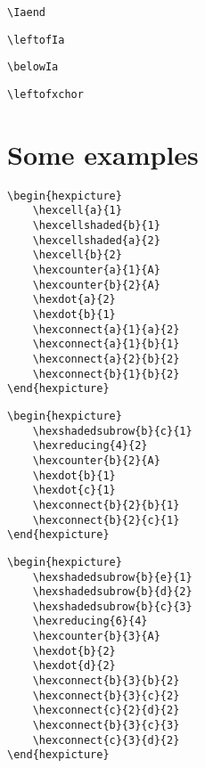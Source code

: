 \documentclass[a4paper,12pt]{article}
\begin{document}
	\verb|\Iaend|
    
	\verb|\leftofIa|
    
	\verb|\belowIa|
    
	\verb|\leftofxchor|
    
    \section{Some examples}
    
    \begin{verbatim}\begin{hexpicture}
    \hexcell{a}{1}
    \hexcellshaded{b}{1}
    \hexcellshaded{a}{2}
    \hexcell{b}{2}
    \hexcounter{a}{1}{A}
    \hexcounter{b}{2}{A}
    \hexdot{a}{2}
    \hexdot{b}{1}
    \hexconnect{a}{1}{a}{2}
    \hexconnect{a}{1}{b}{1}
    \hexconnect{a}{2}{b}{2}
    \hexconnect{b}{1}{b}{2}
\end{hexpicture}\end{verbatim}
    
    \begin{hexpicture}
    \end{hexpicture}
    
    \begin{verbatim}\begin{hexpicture}
    \hexshadedsubrow{b}{c}{1}
    \hexreducing{4}{2}
    \hexcounter{b}{2}{A}
    \hexdot{b}{1}
    \hexdot{c}{1}
    \hexconnect{b}{2}{b}{1}
    \hexconnect{b}{2}{c}{1}
\end{hexpicture}\end{verbatim}
    
    \begin{hexpicture}
    \end{hexpicture}
    
    \begin{verbatim}\begin{hexpicture}
    \hexshadedsubrow{b}{e}{1}
    \hexshadedsubrow{b}{d}{2}
    \hexshadedsubrow{b}{c}{3}
    \hexreducing{6}{4}
    \hexcounter{b}{3}{A}
    \hexdot{b}{2}
    \hexdot{d}{2}
    \hexconnect{b}{3}{b}{2}
    \hexconnect{b}{3}{c}{2}
    \hexconnect{c}{2}{d}{2}
    \hexconnect{b}{3}{c}{3}
    \hexconnect{c}{3}{d}{2}
\end{hexpicture}\end{verbatim}
    
\end{document}
